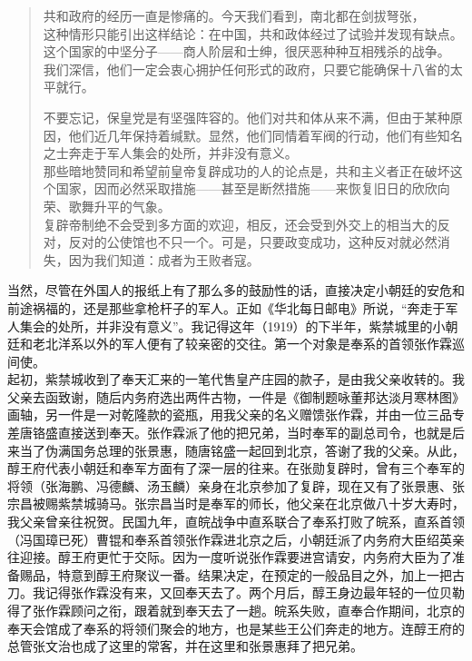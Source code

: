 \begin{quote}
	共和政府的经历一直是惨痛的。今天我们看到，南北都在剑拔弩张，\\

这种情形只能引出这样结论：在中国，共和政体经过了试验并发现有缺点。\\

这个国家的中坚分子——商人阶层和士绅，很厌恶种种互相残杀的战争。\\

我们深信，他们一定会衷心拥护任何形式的政府，只要它能确保十八省的太平就行。

不要忘记，保皇党是有坚强阵容的。他们对共和体从来不满，但由于某种原因，他们近几年保持着缄默。显然，他们同情着军阀的行动，他们有些知名之士奔走于军人集会的处所，并非没有意义。\\

那些暗地赞同和希望前皇帝复辟成功的人的论点是，共和主义者正在破坏这个国家，因而必然采取措施——甚至是断然措施——来恢复旧日的欣欣向荣、歌舞升平的气象。\\

复辟帝制绝不会受到多方面的欢迎，相反，还会受到外交上的相当大的反对，反对的公使馆也不只一个。可是，只要政变成功，这种反对就必然消失，因为我们知道：成者为王败者寇。\\
\end{quote}

当然，尽管在外国人的报纸上有了那么多的鼓励性的话，直接决定小朝廷的安危和前途祸福的，还是那些拿枪杆子的军人。正如《华北每日邮电》所说，“奔走于军人集会的处所，并非没有意义”。我记得这年（1919）的下半年，紫禁城里的小朝廷和老北洋系以外的军人便有了较亲密的交往。第一个对象是奉系的首领张作霖巡间使。\\

起初，紫禁城收到了奉天汇来的一笔代售皇产庄园的款子，是由我父亲收转的。我父亲去函致谢，随后内务府选出两件古物，一件是《御制题咏董邦达淡月寒林图》画轴，另一件是一对乾隆款的瓷瓶，用我父亲的名义赠馈张作霖，并由一位三品专差唐铬盛直接送到奉天。张作霖派了他的把兄弟，当时奉军的副总司令，也就是后来当了伪满国务总理的张景惠，随唐铭盛一起回到北京，答谢了我的父亲。从此，醇王府代表小朝廷和奉军方面有了深一层的往来。在张勋复辟时，曾有三个奉军的将领（张海鹏、冯德麟、汤玉麟）亲身在北京参加了复辟，现在又有了张景惠、张宗昌被赐紫禁城骑马。张宗昌当时是奉军的师长，他父亲在北京做八十岁大寿时，我父亲曾亲往祝贺。民国九年，直皖战争中直系联合了奉系打败了皖系，直系首领（冯国璋已死）曹锟和奉系首领张作霖进北京之后，小朝廷派了内务府大臣绍英亲往迎接。醇王府更忙于交际。因为一度听说张作霖要进宫请安，内务府大臣为了准备赐品，特意到醇王府聚议一番。结果决定，在预定的一般品目之外，加上一把古刀。我记得张作霖没有来，又回奉天去了。两个月后，醇王身边最年轻的一位贝勒得了张作霖顾问之衔，跟着就到奉天去了一趟。皖系失败，直奉合作期间，北京的奉天会馆成了奉系的将领们聚会的地方，也是某些王公们奔走的地方。连醇王府的总管张文治也成了这里的常客，并在这里和张景惠拜了把兄弟。\\


